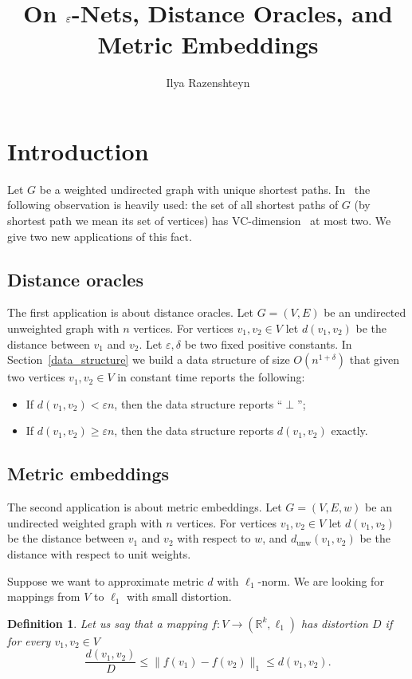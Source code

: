 \documentclass{article}
\title{On $\eps$-Nets, Distance Oracles, and Metric Embeddings}
\author{Ilya Razenshteyn}
\date{}
\newcommand{\dunw}{d_{\mathrm{unw}}}
\newcommand{\eps}{\varepsilon}
\newtheorem{definition}{Definition}
\begin{document}
    \maketitle
    \section{Introduction}

    Let $G$ be a weighted undirected graph with unique shortest paths.
    In~\cite{ADFGW11} the following observation is heavily used: the set of all shortest paths of $G$ (by shortest path we mean its set of vertices)
    has VC-dimension~\cite{VC71} at most two.
    We give two new applications of this fact.

    \subsection{Distance oracles}

    The first application is about distance oracles.
    Let $G = (V, E)$ be an undirected unweighted graph with $n$ vertices.
    For vertices $v_1, v_2 \in V$ let $d(v_1, v_2)$ be the distance between $v_1$ and $v_2$.
    Let $\eps, \delta$ be two fixed positive constants.
    In Section~\ref{data_structure}
    we build a data structure of size $O(n^{1 + \delta})$ that given two vertices $v_1, v_2 \in V$ in constant time reports the following:
    \begin{itemize}
        \item If $d(v_1, v_2) < \eps n$, then the data structure reports ``$\perp$'';
        \item If $d(v_1, v_2) \geq \eps n$, then the data structure reports $d(v_1, v_2)$ exactly.
    \end{itemize}

    \subsection{Metric embeddings}

    The second application is about metric embeddings.
    Let $G = (V, E, w)$ be an undirected weighted graph with $n$ vertices.
    For vertices $v_1, v_2 \in V$ let $d(v_1, v_2)$ be the distance between $v_1$ and $v_2$ with respect to $w$,
    and $\dunw(v_1, v_2)$ be the distance with respect to unit weights.

    Suppose we want to approximate metric $d$ with $\ell_1$-norm. We are looking for mappings from $V$ to $\ell_1$ with small distortion. 
    \begin{definition}
        Let us say that a mapping $f \colon V \to (\mathbb{R}^k, \ell_1)$ has distortion $D$ if for every $v_1, v_2 \in V$
        $$
            \frac{d(v_1, v_2)}{D} \leq \|f(v_1) - f(v_2)\|_1 \leq d(v_1, v_2).
        $$
    \end{definition}
\end{document}
